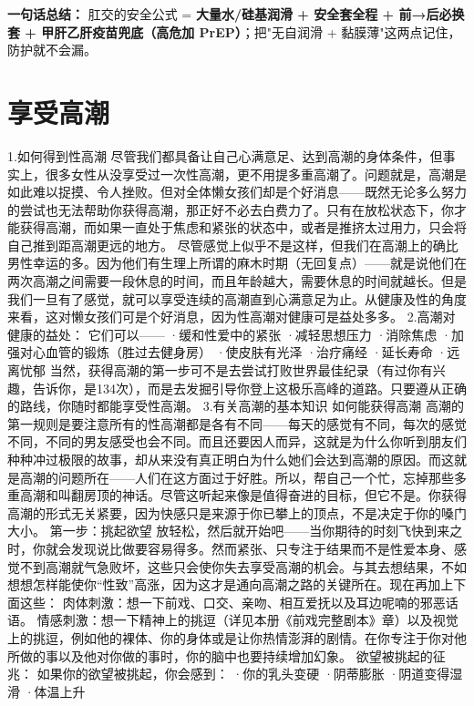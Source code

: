 \documentclass[12pt,UTF8,openany]{ctexbook}
\begin{document}
\vspace{1em}
\noindent\textbf{一句话总结：} 肛交的安全公式 = \textbf{大量水/硅基润滑 + 安全套全程 + 前→后必换套 + 甲肝乙肝疫苗兜底（高危加 PrEP）}；把"无自润滑 + 黏膜薄"这两点记住，防护就不会漏。

\chapter{享受高潮}
1.如何得到性高潮
尽管我们都具备让自己心满意足、达到高潮的身体条件，但事实上，很多女性从没享受过一次性高潮，更不用提多重高潮了。问题就是，高潮是如此难以捉摸、令人挫败。但对全体懒女孩们却是个好消息——既然无论多么努力的尝试也无法帮助你获得高潮，那正好不必去白费力了。只有在放松状态下，你才能获得高潮，而如果一直处于焦虑和紧张的状态中，或者是推挤太过用力，只会将自己推到距高潮更远的地方。
尽管感觉上似乎不是这样，但我们在高潮上的确比男性幸运的多。因为他们有生理上所谓的麻木时期（无回复点）——就是说他们在两次高潮之间需要一段休息的时间，而且年龄越大，需要休息的时间就越长。但是我们一旦有了感觉，就可以享受连续的高潮直到心满意足为止。从健康及性的角度来看，这对懒女孩们可是个好消息，因为性高潮对健康可是益处多多。
2.高潮对健康的益处：
它们可以——
·缓和性爱中的紧张
·减轻思想压力
·消除焦虑
·加强对心血管的锻炼（胜过去健身房）
·使皮肤有光泽
·治疗痛经
·延长寿命
·远离忧郁
当然，获得高潮的第一步可不是去尝试打败世界最佳纪录（有过你有兴趣，告诉你，是134次），而是去发掘引导你登上这极乐高峰的道路。只要遵从正确的路线，你随时都能享受性高潮。
3.有关高潮的基本知识
如何能获得高潮
高潮的第一规则是要注意所有的性高潮都是各有不同——每天的感觉有不同，每次的感觉不同，不同的男友感受也会不同。而且还要因人而异，这就是为什么你听到朋友们种种冲过极限的故事，却从来没有真正明白为什么她们会达到高潮的原因。而这就是高潮的问题所在——人们在这方面过于好胜。所以，帮自己一个忙，忘掉那些多重高潮和叫翻房顶的神话。尽管这听起来像是值得奋进的目标，但它不是。你获得高潮的形式无关紧要，因为快感只是来源于你已攀上的顶点，不是决定于你的嗓门大小。
第一步：挑起欲望
放轻松，然后就开始吧——当你期待的时刻飞快到来之时，你就会发现说比做要容易得多。然而紧张、只专注于结果而不是性爱本身、感觉不到高潮就气急败坏，这些只会使你失去享受高潮的机会。与其去想结果，不如想想怎样能使你“性致”高涨，因为这才是通向高潮之路的关键所在。现在再加上下面这些：
肉体刺激：想一下前戏、口交、亲吻、相互爱抚以及耳边呢喃的邪恶话语。
情感刺激：想一下精神上的挑逗（详见本册《前戏完整剧本》章）以及视觉上的挑逗，例如他的裸体、你的身体或是让你热情澎湃的剧情。在你专注于你对他所做的事以及他对你做的事时，你的脑中也要持续增加幻象。
欲望被挑起的征兆：
如果你的欲望被挑起，你会感到：
·你的乳头变硬
·阴蒂膨胀
·阴道变得湿滑
·体温上升
\end{document}
